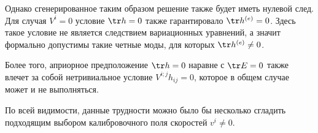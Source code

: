 \documentclass[\docroot/reports/draft/report.tex]{subfiles}
\begin{document}
    Однако сгенерированное таким образом решение также будет иметь нулевой след. Для случая $V^i = 0$ условие $\tr h = 0$ также гарантировало $\tr h^{(e)} = 0$. Здесь такое условие не является следствием вариационных уравнений, а значит формально допустимы такие четные моды, для которых $\tr h^{(e)} \neq 0$.

    Более того, априорное предположение $\tr h = 0$ наравне с $\tr E = 0$ также влечет за собой нетривиальное условие $V^{i;j} h_{ij} = 0$, которое в общем случае может и не выполняться.

    По всей видимости, данные трудности можно было бы несколько сгладить подходящим выбором калибровочного поля скоростей $v^i \neq 0$.

\end{document}
